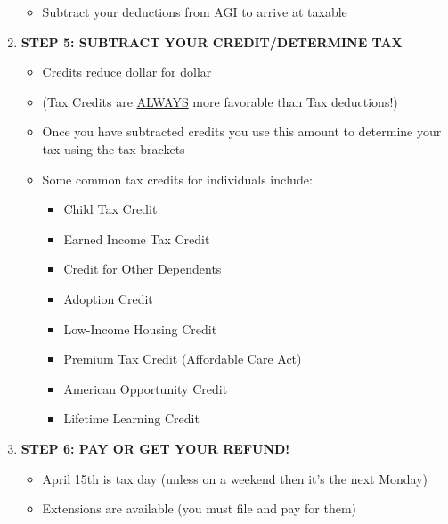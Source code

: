 \documentclass[12pt]{article}
\begin{document}
\begin{enumerate}
                        \begin{itemize}
                            \item Subtract your deductions from AGI to arrive at taxable
                        \end{itemize}
                    \item \textbf{STEP 5: SUBTRACT YOUR CREDIT/DETERMINE TAX}
                        \begin{itemize}
                            \item Credits reduce dollar for dollar
                            \item (Tax Credits are \underline{ALWAYS} more favorable than Tax deductions!)
                            \item Once you have subtracted credits you use this amount to determine your tax using the tax brackets
                            \item Some common tax credits for individuals include:
                                \begin{itemize}
                                    \item Child Tax Credit
                                    \item Earned Income Tax Credit
                                    \item Credit for Other Dependents
                                    \item Adoption Credit
                                    \item Low-Income Housing Credit
                                    \item Premium Tax Credit (Affordable Care Act)
                                    \item American Opportunity Credit
                                    \item Lifetime Learning Credit
                                \end{itemize}
                        \end{itemize}
                    \item \textbf{STEP 6: PAY OR GET YOUR REFUND!}
                        \begin{itemize}
                            \item April 15th is tax day (unless on a weekend then it's the next Monday)
                            \item Extensions are available (you must file and pay for them)
                        \end{itemize}
                \end{enumerate}
                    
\end{document}
